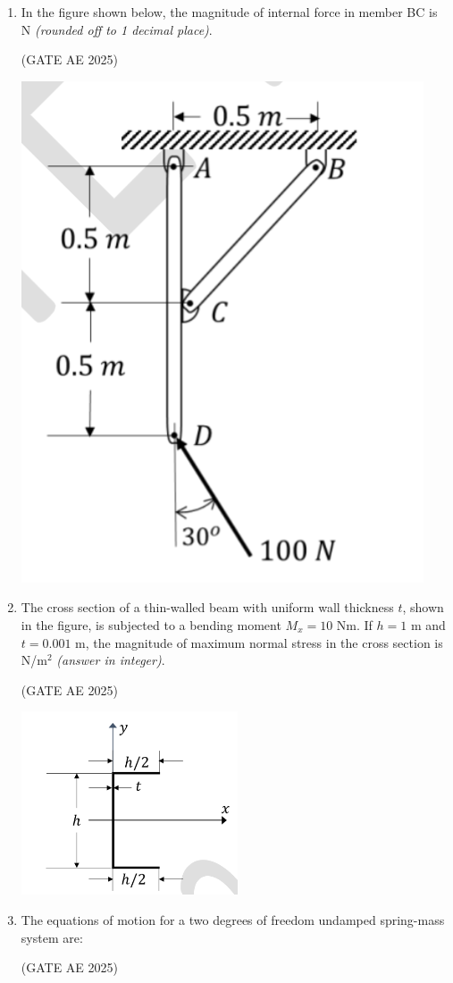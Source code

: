 \documentclass[journal,12pt,onecolumn]{IEEEtran}
\theoremstyle{remark}
\begin{document}
\begin{flushleft}
\begin{enumerate}
\begin{center}
\caption{}
    \label{fig:placeholder}
    \end{center}


\item In the figure shown below, the magnitude of internal force in member BC is \underline{\hspace{3cm}} N \textit{(rounded off to 1 decimal place)}. 

\hfill (GATE AE 2025)

\begin{center}
\includegraphics[width=0.3\columnwidth]{figs/53.png}
\caption{}
    \label{fig:placeholder}
\end{center}


\item The cross section of a thin-walled beam with uniform wall thickness $t$, shown in the figure, is subjected to a bending moment $M_x = 10$ Nm. If $h = 1$ m and $t = 0.001$ m, the magnitude of maximum normal stress in the cross section is \underline{\hspace{3cm}} N/m$^2$ \textit{(answer in integer)}.

\hfill (GATE AE 2025)

\begin{center}
\includegraphics[width=0.4\columnwidth]{figs/54.png}
\caption{}
    \label{fig:placeholder}
\end{center}

\item The equations of motion for a two degrees of freedom undamped spring-mass system are:

\hfill (GATE AE 2025)


\end{enumerate}
\end{flushleft}
\end{document}

